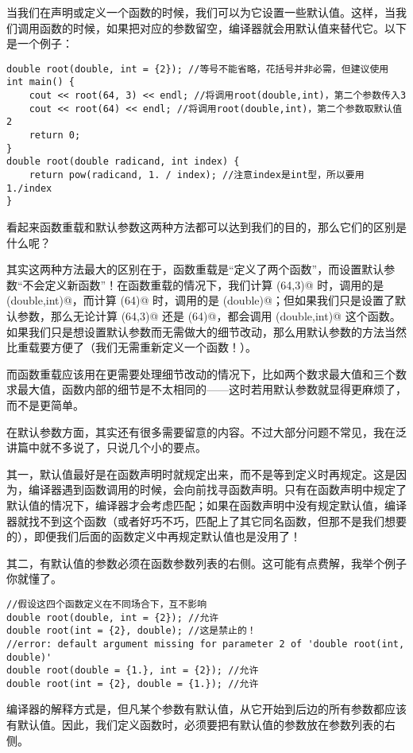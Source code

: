当我们在声明或定义一个函数的时候，我们可以为它设置一些默认值。这样，当我们调用函数的时候，如果把对应的参数留空，编译器就会用默认值来替代它。以下是一个例子：
\begin{lstlisting}
double root(double, int = {2}); //等号不能省略，花括号并非必需，但建议使用
int main() {
    cout << root(64, 3) << endl; //将调用root(double,int)，第二个参数传入3
    cout << root(64) << endl; //将调用root(double,int)，第二个参数取默认值2
    return 0;
}
double root(double radicand, int index) {
    return pow(radicand, 1. / index); //注意index是int型，所以要用1./index
}
\end{lstlisting}
看起来函数重载和默认参数这两种方法都可以达到我们的目的，那么它们的区别是什么呢？\par
其实这两种方法最大的区别在于，函数重载是``定义了两个函数''，而设置默认参数``不会定义新函数''！在函数重载的情况下，我们计算 \lstinline@root(64,3)@ 时，调用的是 \lstinline@root(double,int)@，而计算 \lstinline@root(64)@ 时，调用的是 \lstinline@root(double)@；但如果我们只是设置了默认参数，那么无论计算 \lstinline@root(64,3)@ 还是 \lstinline@root(64)@，都会调用 \lstinline@root(double,int)@ 这个函数。如果我们只是想设置默认参数而无需做大的细节改动，那么用默认参数的方法当然比重载要方便了（我们无需重新定义一个函数！）。\par
而函数重载应该用在更需要处理细节改动的情况下，比如两个数求最大值和三个数求最大值，函数内部的细节是不太相同的——这时若用默认参数就显得更麻烦了，而不是更简单。\par
在默认参数方面，其实还有很多需要留意的内容。不过大部分问题不常见，我在泛讲篇中就不多说了，只说几个小的要点。\par
其一，默认值最好是在函数声明时就规定出来，而不是等到定义时再规定。这是因为，编译器遇到函数调用的时候，会向前找寻函数声明。只有在函数声明中规定了默认值的情况下，编译器才会考虑匹配；如果在函数声明中没有规定默认值，编译器就找不到这个函数（或者好巧不巧，匹配上了其它同名函数，但那不是我们想要的），即便我们后面的函数定义中再规定默认值也是没用了！\par
其二，有默认值的参数必须在函数参数列表的右侧。这可能有点费解，我举个例子你就懂了。
\begin{lstlisting}
//假设这四个函数定义在不同场合下，互不影响
double root(double, int = {2}); //允许
double root(int = {2}, double); //这是禁止的！
//error: default argument missing for parameter 2 of 'double root(int, double)'
double root(double = {1.}, int = {2}); //允许
double root(int = {2}, double = {1.}); //允许
\end{lstlisting}
编译器的解释方式是，但凡某个参数有默认值，从它开始到后边的所有参数都应该有默认值。因此，我们定义函数时，必须要把有默认值的参数放在参数列表的右侧。\par
